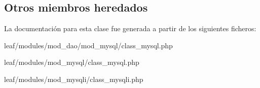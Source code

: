 \subsection*{Otros miembros heredados}


La documentación para esta clase fue generada a partir de los siguientes ficheros\-:\begin{DoxyCompactItemize}
\item 
leaf/modules/mod\-\_\-dao/mod\-\_\-mysql/class\-\_\-mysql.\-php\item 
leaf/modules/mod\-\_\-mysql/class\-\_\-mysql.\-php\item 
leaf/modules/mod\-\_\-mysqli/class\-\_\-mysqli.\-php\end{DoxyCompactItemize}
